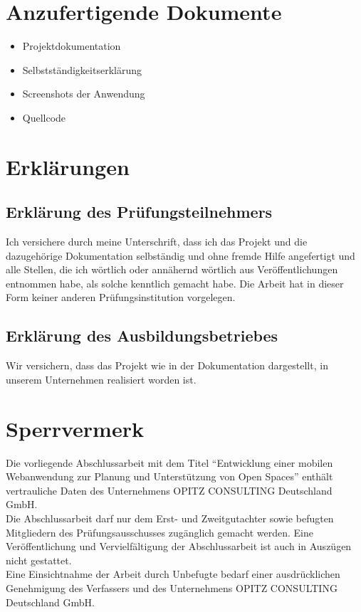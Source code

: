 \documentclass[12pt,a4paper]{scrartcl}
\begin{document}
\section*{Anzufertigende Dokumente}
\begin{itemize}
\item Projektdokumentation
\item Selbstständigkeitserklärung
\item Screenshots der Anwendung
\item Quellcode
\end{itemize}\section*{Erklärungen}
\subsection*{Erklärung des Prüfungsteilnehmers}
Ich versichere durch meine Unterschrift, dass ich das Projekt und die dazugehörige Dokumentation
selbständig und ohne fremde Hilfe angefertigt und alle Stellen, die ich wörtlich oder annähernd
wörtlich aus Veröffentlichungen entnommen habe, als solche kenntlich gemacht habe. Die Arbeit
hat in dieser Form keiner anderen Prüfungsinstitution vorgelegen.\\[1.5cm]
\subsection*{Erklärung des Ausbildungsbetriebes}
Wir versichern, dass das Projekt wie in der Dokumentation dargestellt, in unserem Unternehmen
realisiert worden ist.\\[1.5cm]
\section*{Sperrvermerk}
Die vorliegende Abschlussarbeit mit dem Titel ``Entwicklung einer mobilen Webanwendung zur Planung und Unterstützung von Open Spaces'' enthält vertrauliche Daten des Unternehmens OPITZ CONSULTING Deutschland GmbH.
\\[0.5cm]
Die Abschlussarbeit darf nur dem Erst-  und Zweitgutachter sowie  befugten Mitgliedern des
Prüfungsausschusses zugänglich gemacht werden. Eine Veröffentlichung und Vervielfältigung
der Abschlussarbeit ist \- auch in Auszügen \- nicht gestattet.
\\[0.5cm]
Eine Einsichtnahme der Arbeit durch Unbefugte bedarf einer ausdrücklichen Genehmigung des
Verfassers und des Unternehmens OPITZ CONSULTING Deutschland GmbH.
\newpage
\tableofcontents
\newpage
\end{document}
